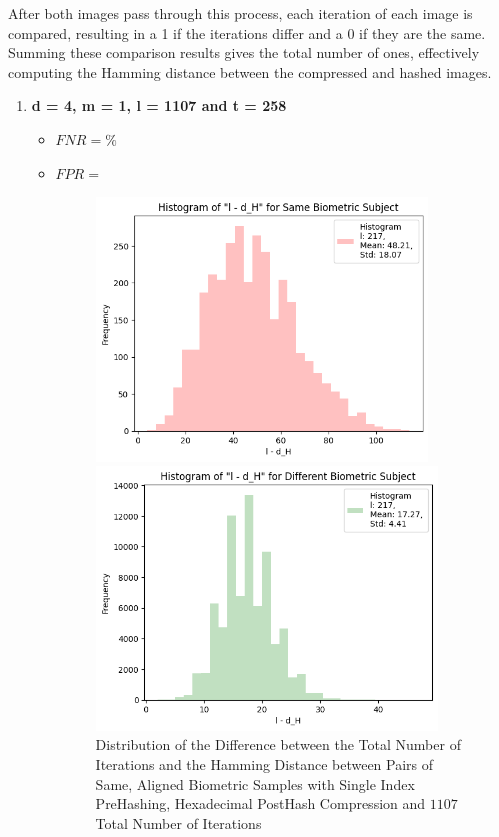 After both images pass through this process, each iteration of each image is compared, resulting in a 1 if the iterations differ and a 0 if they are the same. Summing these comparison results gives the total number of ones, effectively computing the Hamming distance between the compressed and hashed images.

\begin{enumerate}
    \item \textbf{d = 4, m = 1, l = 1107 and t = 258}
        \begin{itemize}
            \item $FNR = \%$
            \item $FPR = $

            \begin{figure}[H]
                \centering
                \begin{minipage}[b]{0.48\linewidth}
                    \centering
                    \includegraphics[width=\linewidth,height=7cm,keepaspectratio]{latex-img/l-dHconfig1a_same.png}
                    \caption{Distribution of the Difference between the Total Number of Iterations and the Hamming Distance between Pairs of Same, Aligned Biometric Samples with Single Index PreHashing, Hexadecimal PostHash Compression and $1107$ Total Number of Iterations}
                    \label{l-dHconfig1a_same}
                \end{minipage}
                \hfill
                \begin{minipage}[b]{0.48\linewidth}
                    \centering
                    \includegraphics[width=\linewidth,height=7cm,keepaspectratio]{latex-img/l-dHconfig1a_diff.png}

\end{minipage}
\end{figure}
\end{itemize}
\end{enumerate}
